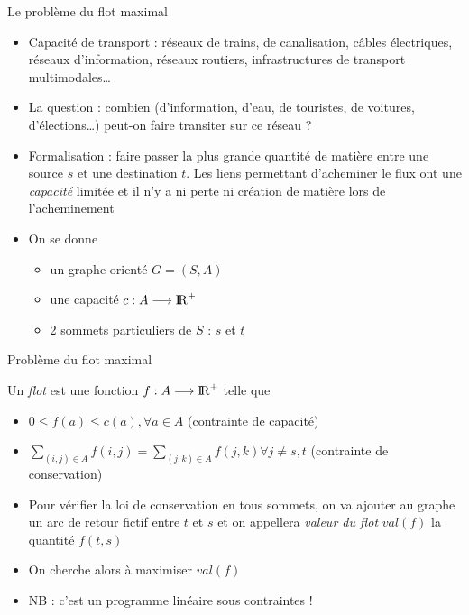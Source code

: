 
\begin{frame}{Le problème du flot maximal}
    \begin{itemize}
        \item Capacité de transport : réseaux de trains, de canalisation, câbles électriques, réseaux d'information, réseaux routiers, infrastructures de transport multimodales\dots
        \item La question : combien (d'information, d'eau, de touristes, de voitures,  d'élections\dots) peut-on faire transiter sur ce réseau ?
        \item Formalisation : faire passer la plus grande quantité de matière entre une source $s$ et une destination $t$. Les liens permettant d'acheminer le flux ont une \emph{capacité} limitée et il n'y a ni perte ni création de matière lors de l'acheminement 
        \item On se donne 
        \begin{itemize}
            \item un graphe orienté $G=(S,A)$
            \item une capacité $c : A \longrightarrow \mathrm{I\! R}^+$
            \item 2 sommets particuliers de $S$ : $s$ et $t$ 
        \end{itemize}
    \end{itemize}
\end{frame}

\begin{frame}{Problème du flot maximal}
    \begin{definition}
        Un \emph{flot} est une fonction $f : A \longrightarrow \mathrm{I\! R}^+$ telle que 
        \begin{itemize}
            \item $0 \leq f(a) \leq c(a), \forall a \in A$ (contrainte de capacité)
            \item $ \sum_{(i,j) \in A} f(i,j) = \sum_{(j,k) \in A} f(j,k) \forall j \neq s,t$ (contrainte de conservation)
        \end{itemize}
    \end{definition}
    \begin{itemize}
        \item Pour vérifier la loi de conservation en tous sommets, on va ajouter au graphe un arc de retour fictif entre $t$ et $s$ et on appellera \emph{valeur du flot} $val(f)$ la quantité $f(t,s)$ 
        \item On cherche alors à maximiser $val(f)$ 
        \item NB : c'est un programme linéaire sous contraintes !
    \end{itemize}
\end{frame}

